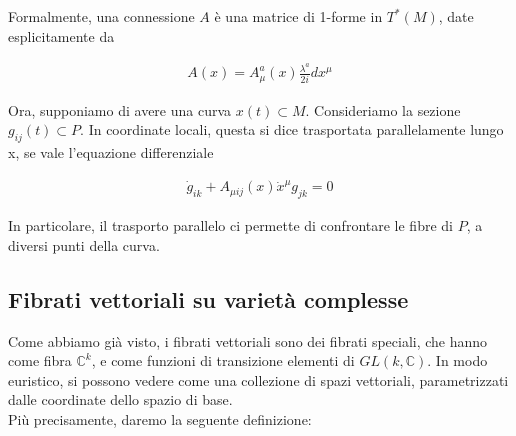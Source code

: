 \documentclass{report}
\begin{document}
Formalmente, una connessione \(A\) è una matrice di 1-forme in \(T^*(M)\), date esplicitamente da 

\begin{align}
    A(x) = A^a_\mu (x)\frac{\lambda^a}{2i}dx^{\mu}
\end{align}

Ora, supponiamo di avere una curva \(x(t)\subset M\). Consideriamo la sezione \(g_{ij}(t) \subset P\). In coordinate locali, questa si dice trasportata parallelamente lungo x, se vale l'equazione differenziale

\begin{align}
    \dot{g}_{ik} + A_{\mu i j}(x)\dot{x}^{\mu}g_{jk} = 0 
\end{align}


In particolare, il trasporto parallelo ci permette di confrontare le fibre di \(P\), a diversi punti della curva.  














































\subsection{Fibrati vettoriali su varietà complesse}


Come abbiamo già visto, i fibrati vettoriali sono dei fibrati speciali, che hanno come fibra \(\mathbb{C}^k\), e come funzioni di transizione elementi di \(GL(k, \mathbb{C})\). In modo euristico, si possono vedere come una collezione di spazi vettoriali, parametrizzati dalle coordinate dello spazio di base. \\

Più precisamente, daremo la seguente definizione: 
\end{document}
